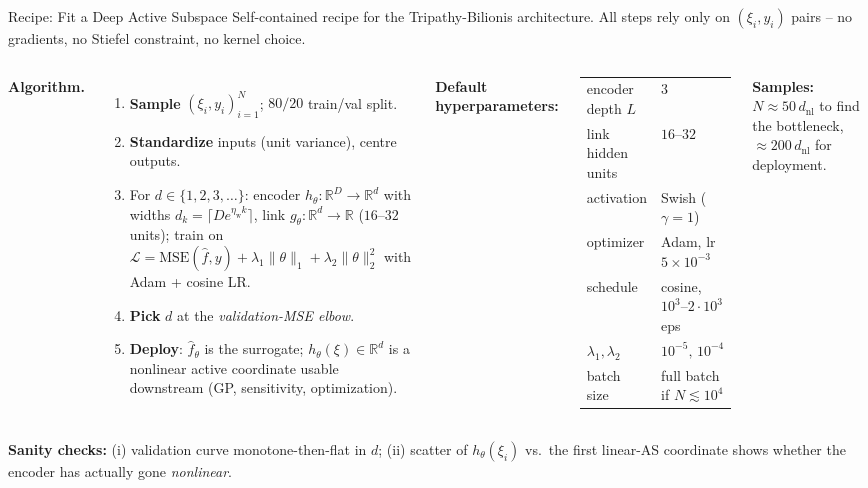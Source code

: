 \documentclass[aspectratio=169,11pt]{beamer}
\newcommand{\emphc}[1]{\textcolor{harvardcrimson}{#1}}
\newcommand{\R}{\mathbb{R}}
\begin{document}
\begin{frame}{Recipe: Fit a Deep Active Subspace}
\scriptsize
Self-contained recipe for the Tripathy-Bilionis architecture. All steps rely only on $(\xi_i, y_i)$ pairs -- no gradients, no Stiefel constraint, no kernel choice.

\vspace{0.2em}
\begin{columns}[T]
\textbf{Algorithm.}
\begin{enumerate}\itemsep1pt
  \item \textbf{Sample} $(\xi_i, y_i)_{i=1}^N$; $80/20$ train/val split.
  \item \textbf{Standardize} inputs (unit variance), centre outputs.
  \item For $d \in \{1, 2, 3, \ldots\}$:
    encoder $h_\theta\!: \R^D\!\to\!\R^d$ with widths $d_k = \lceil D e^{\eta_{\mathrm{w}} k}\rceil$, link $g_\theta\!: \R^d\!\to\!\R$ ($16$--$32$ units); train on
    $\mathcal L = \text{MSE}(\hat f, y) + \lambda_1\|\theta\|_1 + \lambda_2\|\theta\|_2^2$ with Adam + cosine LR.
  \item \textbf{Pick} $d$ at the \emph{validation-MSE elbow}.
  \item \textbf{Deploy}: $\hat f_\theta$ is the surrogate; $h_\theta(\xi)\!\in\!\R^d$ is a nonlinear \emphc{active coordinate} usable downstream (GP, sensitivity, optimization).
\end{enumerate}

\textbf{Default hyperparameters:}
\vspace{0.1em}
\begin{center}
\renewcommand{\arraystretch}{1.05}
\tiny
\begin{tabular}{l l}
\toprule
encoder depth $L$ & $3$ \\
link hidden units & $16$--$32$ \\
activation & Swish ($\gamma = 1$) \\
optimizer & Adam, lr $5{\times}10^{-3}$ \\
schedule & cosine, $10^3$--$2{\cdot}10^3$ eps \\
$\lambda_1, \lambda_2$ & $10^{-5},\,10^{-4}$ \\
batch size & full batch if $N \lesssim 10^4$ \\
\bottomrule
\end{tabular}
\end{center}

\vspace{0.1em}
{\tiny \textbf{Samples:} $N \!\approx\! 50\,d_{\mathrm{nl}}$ to find the bottleneck, $\approx 200\,d_{\mathrm{nl}}$ for deployment.}
\end{columns}

\vspace{0.1em}
{\tiny \textbf{Sanity checks:} (i) validation curve monotone-then-flat in $d$; (ii) scatter of $h_\theta(\xi_i)$ vs.\ the first linear-AS coordinate shows whether the encoder has actually gone \emph{nonlinear}.}
\end{frame}
\end{document}
